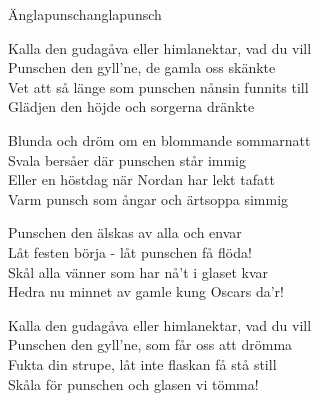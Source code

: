 \begin{song}{Änglapunsch}{anglapunsch}
\begin{vers}
Kalla den gudagåva eller himlanektar, vad du vill\\
Punschen den gyll'ne, de gamla oss skänkte\\
Vet att så länge som punschen nånsin funnits till\\
Glädjen den höjde och sorgerna dränkte\\
\end{vers}
\begin{vers}
Blunda och dröm om en blommande sommarnatt\\
Svala bersåer där punschen står immig\\
Eller en höstdag när Nordan har lekt tafatt\\
Varm punsch som ångar och ärtsoppa simmig\\
\end{vers}
\begin{vers}
Punschen den älskas av alla och envar\\
Låt festen börja - låt punschen få flöda!\\
Skål alla vänner som har nå't i glaset kvar\\
Hedra nu minnet av gamle kung Oscars da'r!\\
\end{vers}
\begin{vers}
Kalla den gudagåva eller himlanektar, vad du vill\\
Punschen den gyll'ne, som får oss att drömma\\
Fukta din strupe, låt inte flaskan få stå still\\
Skåla för punschen och glasen vi tömma!\\
\end{vers}
\end{song}
